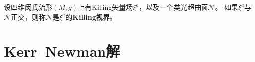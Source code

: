 \begin{definition}\label{chkerr:def_killing-horizon}
    设四维闵氏流形$(M,g)$上有Killing矢量场$\xi^a$，以及一个类光超曲面$\mathcal{N}$。
    如果$\xi^a$与$\mathcal{N}$正交，则称$\mathcal{N}$是$\xi^a$的{\heiti \bfseries Killing视界}。
\end{definition}

%
%
%
%




\section{Kerr--Newman解}

